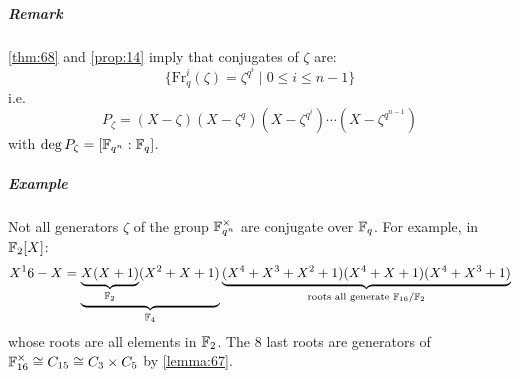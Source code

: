 \subparagraph{Remark}

\autoref{thm:68} and \autoref{prop:14} imply that conjugates of $\zeta$ are:
\begin{equation*}
  \{ \text{Fr}_q^i(\zeta) = \zeta^{q^i} \mid 0 \leq i \leq n-1 \}
\end{equation*}
i.e.
\begin{equation*}
  P_\zeta = (X-\zeta)(X-\zeta^q)(X-\zeta^{q^i})\cdots(X-\zeta^{q^{n-1}})
\end{equation*}
with $\deg P_\zeta = [\mathbb{F}_{q^n} : \mathbb{F}_{q}]$.

\subparagraph{Example}

Not all generators $\zeta$ of the group $\mathbb{F}_{q^n}^\times$ are conjugate over $\mathbb{F}_{q}$. For example, in $\mathbb{F}_{2}[X]$:
\begin{equation*}
  X^16 - X = \underbrace{\underbrace{X(X+1)}_{\mathbb{F}_{2}}(X^2+X+1)}_{\mathbb{F}_{4}}\underbrace{(X^4+X^3+X^2+1)(X^4+X+1)(X^4+X^3+1)}_{\text{roots all generate } \mathbb{F}_{16}/\mathbb{F}_{2}}
\end{equation*}
whose roots are all elements in $\mathbb{F}_{2}$. The 8 last roots are generators of $\mathbb{F}_{16}^\times \cong C_{15} \cong C_3 \times C_5$ by \autoref{lemma:67}.


